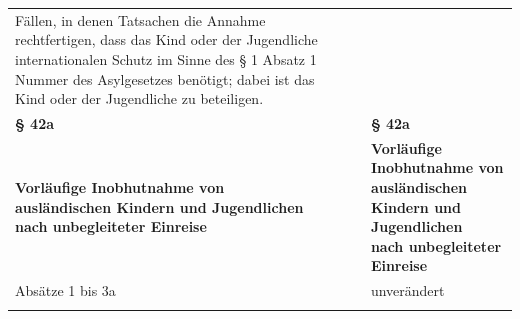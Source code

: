 \documentclass[10pt,a4paper,landscape]{article}
\begin{document}
\begin{longtable}{|L{8.2cm}|L{8.2cm}|L{8.2cm}|}
Fällen, in denen Tatsachen  \newline die Annahme rechtfertigen, dass das Kind  \newline oder der Jugendliche internationalen  \newline Schutz im Sinne des \S{} 1 Absatz 1 Nummer   des Asylgesetzes benötigt; dabei ist das  \newline Kind oder der Jugendliche zu beteiligen. \\
\hhline{|---|}
\textbf{\S{} 42a} &  & \textbf{\S{} 42a} \\
\hhline{|---|}
\textbf{Vorläufige Inobhutnahme von  \newline ausländischen Kindern und Jugendlichen  \newline nach unbegleiteter Einreise} &  & \textbf{Vorläufige Inobhutnahme von  \newline ausländischen Kindern und Jugendlichen  \newline nach unbegleiteter Einreise} \\
\hhline{|---|}
Absätze 1 bis 3a &  & unverändert \\
\hhline{|---|}

\end{longtable}
\end{document}
